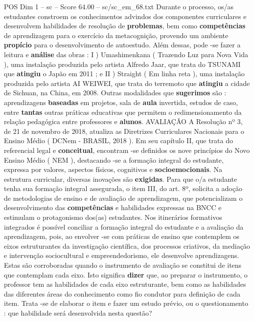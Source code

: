 \begin{textsample}{POS Dim 1 – sc – Score 64.00 – sc/sc\_em\_68.txt}
Durante o processo, os/as estudantes constroem os conhecimentos advindos dos componentes curriculares e desenvolvem habilidades de resolução de \textbf{problemas}, bem como \textbf{competências} de aprendizagem para o exercício da metacognição, provendo um ambiente \textbf{propício} para o desenvolvimento de autoestudo.
Além dessas, pode -se fazer a leitura e \textbf{análise} das obras : I ) Umashimenkana ( Trazendo Luz para Nova Vida ), uma instalação produzida pelo artista Alfredo Jaar, que trata do TSUNAMI que \textbf{atingiu} o Japão em 2011 ; e II ) Straight ( Em linha reta ), uma instalação produzida pelo artista AI WEIWEI, que trata do terremoto que \textbf{atingiu} a cidade de Sichuan, na China, em 2008.
Outras modalidades que \textbf{sugerimos} são : aprendizagens \textbf{baseadas} em projetos, sala de \textbf{aula} invertida, estudos de caso, entre \textbf{tantas} outras práticas educativas que permitem o redimensionamento da relação pedagógica entre professores e \textbf{alunos}.
AVALIAÇÃO A Resolução nº 3, de 21 de novembro de 2018, atualiza as Diretrizes Curriculares Nacionais para o Ensino Médio ( DCNem - BRASIL, 2018 ).
Em seu capítulo II, que trata do referencial legal e \textbf{conceitual}, encontram -se definidos os nove princípios do Novo Ensino Médio ( NEM ), destacando -se a formação integral do estudante, expressa por valores, aspectos físicos, cognitivos e \textbf{socioemocionais}.
Na estrutura curricular, diversas inovações são \textbf{exigidas}.
Para que o/a estudante tenha sua formação integral assegurada, o item III, do art. 8º, solicita a adoção de metodologias de ensino e de avaliação de aprendizagem, que potencializam o desenvolvimento das \textbf{competências} e habilidades expressas na BNCC e estimulam o protagonismo dos(as) estudantes.
Nos itinerários formativos integrados é possível conciliar a formação integral do estudante e a avaliação da aprendizagem, pois, ao envolver -se com práticas de ensino que contemplem os eixos estruturantes da investigação científica, dos processos criativos, da mediação e intervenção sociocultural e empreendedorismo, ele desenvolve aprendizagens.
Estas são corroboradas quando o instrumento de avaliação se constitui de itens que contemplam cada eixo.
Isto significa \textbf{dizer} que, ao preparar o instrumento, o professor tem as habilidades de cada eixo estruturante, bem como as habilidades das diferentes áreas do conhecimento como fio condutor para definição de cada item.
Trata -se de elaborar o item e fazer um estudo prévio, ou o questionamento : que habilidade será desenvolvida nesta questão?

\end{textsample}
